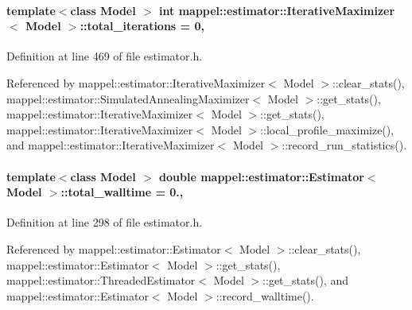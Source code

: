 \paragraph[{\texorpdfstring{total\+\_\+iterations}{total_iterations}}]{\setlength{\rightskip}{0pt plus 5cm}template$<$class Model $>$ int {\bf mappel\+::estimator\+::\+Iterative\+Maximizer}$<$ Model $>$\+::total\+\_\+iterations = 0\hspace{0.3cm}{\ttfamily [protected]}, {\ttfamily [inherited]}}\hypertarget{classmappel_1_1estimator_1_1IterativeMaximizer_a14a3683e595e1db79b9cbc49b0d8688e}{}\label{classmappel_1_1estimator_1_1IterativeMaximizer_a14a3683e595e1db79b9cbc49b0d8688e}


Definition at line 469 of file estimator.\+h.



Referenced by mappel\+::estimator\+::\+Iterative\+Maximizer$<$ Model $>$\+::clear\+\_\+stats(), mappel\+::estimator\+::\+Simulated\+Annealing\+Maximizer$<$ Model $>$\+::get\+\_\+stats(), mappel\+::estimator\+::\+Iterative\+Maximizer$<$ Model $>$\+::get\+\_\+stats(), mappel\+::estimator\+::\+Iterative\+Maximizer$<$ Model $>$\+::local\+\_\+profile\+\_\+maximize(), and mappel\+::estimator\+::\+Iterative\+Maximizer$<$ Model $>$\+::record\+\_\+run\+\_\+statistics().

\paragraph[{\texorpdfstring{total\+\_\+walltime}{total_walltime}}]{\setlength{\rightskip}{0pt plus 5cm}template$<$class Model $>$ double {\bf mappel\+::estimator\+::\+Estimator}$<$ Model $>$\+::total\+\_\+walltime = 0.\hspace{0.3cm}{\ttfamily [protected]}, {\ttfamily [inherited]}}\hypertarget{classmappel_1_1estimator_1_1Estimator_a98ad459e850aeb2c42c10fd06c3b9fbc}{}\label{classmappel_1_1estimator_1_1Estimator_a98ad459e850aeb2c42c10fd06c3b9fbc}


Definition at line 298 of file estimator.\+h.



Referenced by mappel\+::estimator\+::\+Estimator$<$ Model $>$\+::clear\+\_\+stats(), mappel\+::estimator\+::\+Estimator$<$ Model $>$\+::get\+\_\+stats(), mappel\+::estimator\+::\+Threaded\+Estimator$<$ Model $>$\+::get\+\_\+stats(), and mappel\+::estimator\+::\+Estimator$<$ Model $>$\+::record\+\_\+walltime().

